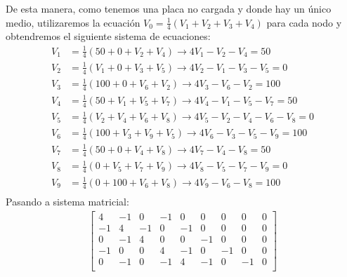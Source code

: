 \documentclass[
  11pt,
  letterpaper,
   answers
  ]{exam}
\begin{document}
\begin{questions}
\begin{solution}
\begin{center}
\end{center}
De esta manera, como tenemos una placa no cargada y donde hay un único medio, utilizaremos la ecuación $V_0 = \frac{1}{4}(V_1 + V_2 + V_3 + V_4)$ para cada nodo y obtendremos el siguiente sistema de ecuaciones:
\begin{align}
    V_1 &= \frac{1}{4}(50 + 0 + V_2 + V_4) \rightarrow 4V_1 - V_2 - V_4 = 50 \\
    V_2 &= \frac{1}{4}(V_1 + 0 + V_3 + V_5) \rightarrow 4V_2 -V_1 -V_3 - V_5 = 0\\
    V_3 &= \frac{1}{4}(100 + 0 + V_6 + V_2) \rightarrow 4V_3 - V_6 - V_2 = 100 \\
    V_4 &= \frac{1}{4}(50 + V_1 + V_5 + V_7) \rightarrow 4V_4 - V_1 - V_5 - V_7 = 50 \\
    V_5 &= \frac{1}{4}(V_2 + V_4 + V_6 + V_8) \rightarrow 4V_5 - V_2 - V_4 - V_6 - V_8 = 0 \\
    V_6 &= \frac{1}{4}(100 + V_3 + V_9 + V_5) \rightarrow 4V_6 - V_3- V_5 - V_9 = 100\\
    V_7 &= \frac{1}{4}(50 + 0 + V_4 + V_8) \rightarrow 4 V_7 - V_4 - V_8 = 50\\
    V_8 &= \frac{1}{4}(0 + V_5 + V_7 + V_9) \rightarrow 4V_8 - V_5 - V_7 - V_9 = 0 \\
    V_9 &= \frac{1}{4}(0 + 100 + V_6 + V_8) \rightarrow 4V_9 - V_6 - V_8 = 100 \\
\end{align}
Pasando a sistema matricial:
\begin{align}
    \begin{bmatrix}
        4 & -1 & 0 & -1 & 0 & 0 & 0 & 0 & 0 \\
        -1 & 4 & -1 & 0 & -1 & 0 & 0 & 0 & 0 \\
        0 & -1 & 4 & 0 & 0 & -1 & 0 & 0 & 0 \\
        -1 & 0 & 0 & 4 & -1 & 0 & -1 & 0 & 0 \\
        0 & -1 & 0 & -1 & 4 & -1 & 0 & -1 & 0 \\

\end{bmatrix}
\end{align}
\end{solution}
\end{questions}
\end{document}
